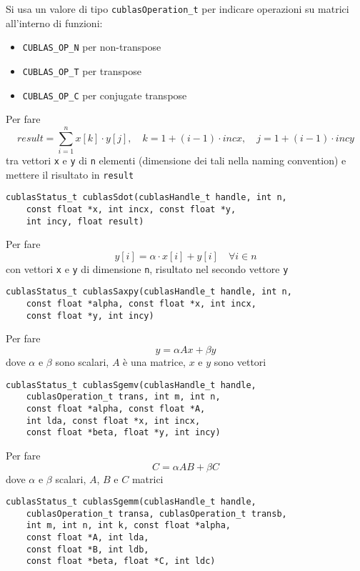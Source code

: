 Si usa un valore di tipo \texttt{cublasOperation\_t} per indicare operazioni su matrici all'interno di funzioni: 
\begin{itemize}
	\item \texttt{CUBLAS\_OP\_N} per non-transpose
	\item \texttt{CUBLAS\_OP\_T} per transpose
	\item \texttt{CUBLAS\_OP\_C} per conjugate transpose
\end{itemize}

Per fare
$$ result = \sum_{i=1}^{n} x[k] \cdot y[j], \quad k = 1 + (i-1) \cdot incx, \quad j = 1 + (i-1) \cdot incy $$
tra vettori \texttt{x} e \texttt{y} di \texttt{n} elementi (dimensione dei tali nella naming convention) e mettere il risultato in \texttt{result}
\begin{verbatim}
cublasStatus_t cublasSdot(cublasHandle_t handle, int n, 
	const float *x, int incx, const float *y, 
	int incy, float result)
\end{verbatim}

Per fare 
$$ y[i] = \alpha \cdot x[i] + y[i] \quad \forall i \in n $$
con vettori \texttt{x} e \texttt{y} di dimensione \texttt{n}, risultato nel secondo vettore \texttt{y}
\begin{verbatim}
cublasStatus_t cublasSaxpy(cublasHandle_t handle, int n,
	const float *alpha, const float *x, int incx, 
	const float *y, int incy)
\end{verbatim}

Per fare 
$$ y = \alpha Ax + \beta y$$
dove $\alpha$ e $\beta$ sono scalari, $A$ è una matrice, $x$ e $y$ sono vettori
\begin{verbatim}
cublasStatus_t cublasSgemv(cublasHandle_t handle, 
	cublasOperation_t trans, int m, int n, 
	const float *alpha, const float *A, 
	int lda, const float *x, int incx, 
	const float *beta, float *y, int incy)
\end{verbatim}

Per fare
$$ C = \alpha AB + \beta C$$
dove $\alpha$ e $\beta$ scalari, $A$, $B$ e $C$ matrici
\begin{verbatim}
cublasStatus_t cublasSgemm(cublasHandle_t handle,
	cublasOperation_t transa, cublasOperation_t transb,
	int m, int n, int k, const float *alpha,
	const float *A, int lda,
	const float *B, int ldb,
	const float *beta, float *C, int ldc)
\end{verbatim}

